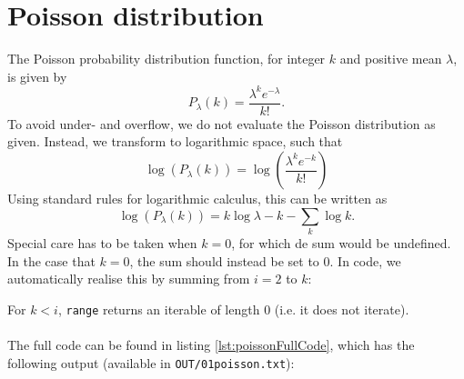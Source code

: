 \section{Poisson distribution}
The Poisson probability distribution function, for integer $k$ and positive mean $\lambda$, is given by
\begin{equation}
	P_\lambda(k) = \frac{\lambda^k e^{-\lambda}}{k!}.
\end{equation}
To avoid under- and overflow, we do not evaluate the Poisson distribution as given. Instead, we transform to logarithmic space, such that
\begin{equation}
	\log\left(P_\lambda(k)\right) = \log\left(\frac{\lambda^k e^{-k}}{k!}\right)
\end{equation}
Using standard rules for logarithmic calculus, this can be written as
\begin{equation}
	\log\left(P_\lambda(k)\right) = k\log{\lambda} - k - \sum_k \log{k}.
\end{equation}
Special care has to be taken when $k=0$, for which de sum would be undefined. In the case that $k=0$, the sum should instead be set to $0$. In code, we automatically realise this by summing from $i=2$ to $k$:

For $k<i$, \verb|range| returns an iterable of length $0$ (i.e. it does not iterate).\\
\\
The full code can be found in listing \ref{lst:poissonFullCode}, which has the following output (available in \texttt{OUT/01poisson.txt}):



